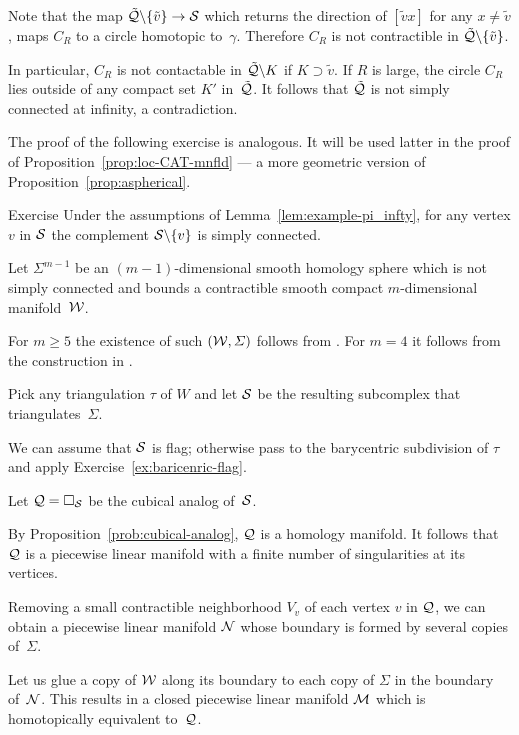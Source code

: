 Note that the map $\tilde{\spc{Q}}\backslash \{\tilde v\}\to \spc{S}$
which returns the direction of $[{\tilde v}{x}]$  for any $x\ne \tilde v$, maps $C_R$ to a circle homotopic to~$\gamma$.
Therefore $C_R$ is not contractible in $\tilde{\mathcal{Q}}\backslash \{\tilde v\}$.

In particular, 
$C_R$ is not contactable in $\tilde{\mathcal{Q}}\backslash K$
if $K\supset \tilde v$.
If $R$ is large, 
the circle $C_R$  
lies outside of any compact set $K'$ in~$\tilde{\mathcal{Q}}$.
It follows that $\tilde{\mathcal{Q}}$ is not simply connected at infinity, a contradiction.
\qeds

The proof of the following exercise is analogous.
It will be used latter in the proof of Proposition~\ref{prop:loc-CAT-mnfld} --- a more geometric version of Proposition~\ref{prop:aspherical}.

\begin{thm}{Exercise}\label{ex:example-pi_infty-new}
Under the assumptions of Lemma~\ref{lem:example-pi_infty}, 
for any vertex $v$ in $\mathcal{S}$
the complement $\mathcal{S}\backslash\{v\}$ is simply connected.
\end{thm}

Let $\Sigma^{m-1}$ be an $(m-1)$-dimensional smooth homology sphere which is not simply connected and bounds a contractible smooth compact $m$-dimensional manifold~$\mathcal{W}$. 

For $m\ge 5$ the existence of such $(\mathcal{W}, \varSigma)$ follows from \cite{kervaire}. 
For $m=4$ it follows from the construction in \cite{mazur}.

Pick any triangulation $\tau$ of $W$ and let $\mathcal{S}$ be the resulting subcomplex that triangulates~$\Sigma$.


We can assume that $\mathcal{S}$ is flag; 
otherwise pass to the barycentric subdivision 
of $\tau$ and apply Exercise~\ref{ex:baricenric-flag}.


Let $\mathcal{Q}=\square_{\mathcal{S}}$ be the cubical analog of~$\mathcal{S}$.

By Proposition~\ref{prob:cubical-analog},
$\mathcal{Q}$ is a homology manifold.
It follows that $\mathcal{Q}$ is a piecewise linear manifold 
with a finite number of singularities at its vertices.


Removing a small contractible neighborhood $V_v$ of each vertex $v$ in $\mathcal{Q}$,
we can obtain a piecewise linear manifold $\mathcal{N}$
whose boundary is formed by several copies of~$\Sigma$.

Let us glue a copy of  $\mathcal{W}$ along its boundary to each copy of $\Sigma$ in the boundary of~$\mathcal{N}$.
This results in a  closed piecewise linear manifold 
$\mathcal{M}$ which is homotopically equivalent to~$\mathcal{Q}$.

